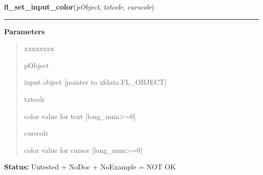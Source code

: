 \hspace{.8\funcindent}\begin{boxedminipage}{\funcwidth}

    \raggedright \textbf{fl\_set\_input\_color}(\textit{pObject}, \textit{txtcolr}, \textit{curscolr})

    \vspace{-1.5ex}

    \rule{\textwidth}{0.5\fboxrule}
\setlength{\parskip}{2ex}
\setlength{\parskip}{1ex}
      \textbf{Parameters}
      \vspace{-1ex}

      \begin{quote}
        \begin{Ventry}{xxxxxxxx}

          \item[pObject]

          input object [pointer to xfdata.FL\_OBJECT]

          \item[txtcolr]

          color value for text [long\_num{\textgreater}=0]

          \item[curscolr]

          color value for cursor [long\_num{\textgreater}=0]

        \end{Ventry}

      \end{quote}

\textbf{Status:} Untested + NoDoc + NoExample = NOT OK



    \end{boxedminipage}

    \label{xformslib:library:fl_get_input_color}

    \vspace{0.5ex}

